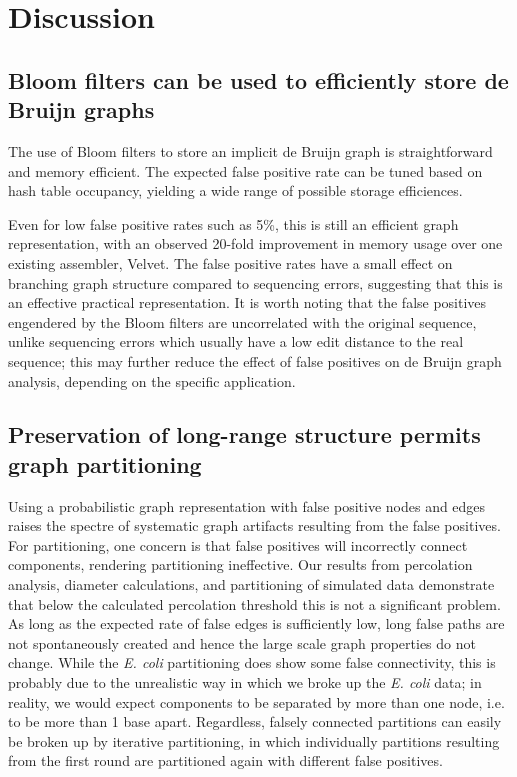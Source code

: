 \documentclass[12pt]{article} \usepackage{simplemargins}
\begin{document}
\section{Discussion}


\subsection{Bloom filters can be used to efficiently store de Bruijn graphs}

The use of Bloom filters to store an implicit de Bruijn graph is
straightforward and memory efficient.  The expected false positive
rate can be tuned based on hash table occupancy, yielding a wide range
of possible storage efficiences.

Even for low false positive rates such as 5\%, this is still an
efficient graph representation, with an observed 20-fold improvement
in memory usage over one existing assembler, Velvet.  The false
positive rates have a small effect on branching graph structure
compared to sequencing errors, suggesting that this is an effective
practical representation.  It is worth noting that the false positives
engendered by the Bloom filters are uncorrelated with the original
sequence, unlike sequencing errors which usually have a low edit
distance to the real sequence; this may further reduce the effect of
false positives on de Bruijn graph analysis, depending on the specific
application.

\subsection{Preservation of long-range structure permits graph partitioning}

Using a probabilistic graph representation with false positive nodes
and edges raises the spectre of systematic graph artifacts resulting
from the false positives.  For partitioning, one concern is that false
positives will incorrectly connect components, rendering partitioning
ineffective.  Our results from percolation analysis, diameter
calculations, and partitioning of simulated data demonstrate that
below the calculated percolation threshold this is not a significant
problem.  As long as the expected rate of false edges is sufficiently
low, long false paths are not spontaneously created and hence the
large scale graph properties do not change.  While the \emph{E. coli}
partitioning does show some false connectivity, this is probably due
to the unrealistic way in which we broke up the \emph{E. coli} data;
in reality, we would expect components to be separated by more than
one node, i.e. to be more than 1 base apart.  Regardless, falsely
connected partitions can easily be broken up by iterative
partitioning, in which individually partitions resulting from the first round are
partitioned again with different false positives.
\end{document}

